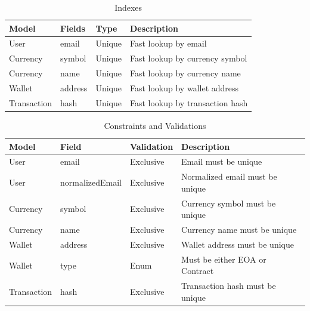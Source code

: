 \begin{table}[htbp]
  \centering
  \caption{Indexes}
  \footnotesize
  \renewcommand{\arraystretch}{1.4}
  \setlength{\tabcolsep}{6pt}
  \begin{tabular}{|l|l|l|p{4.8cm}|}
    \hline
    \textbf{Model} & \textbf{Fields} & \textbf{Type} & \textbf{Description} \\
    \hline
    User & email & Unique & Fast lookup by email \\
    \hline
    Currency & symbol & Unique & Fast lookup by currency symbol \\
    \hline
    Currency & name & Unique & Fast lookup by currency name \\
    \hline
    Wallet & address & Unique & Fast lookup by wallet address \\
    \hline
    Transaction & hash & Unique & Fast lookup by transaction hash \\
    \hline
  \end{tabular}
\end{table}

\begin{table}[htbp]
  \centering
  \caption{Constraints and Validations}
  \footnotesize
  \renewcommand{\arraystretch}{1.4}
  \setlength{\tabcolsep}{6pt}
  \begin{tabular}{|l|l|l|p{5cm}|}
    \hline
    \textbf{Model} & \textbf{Field} & \textbf{Validation} & \textbf{Description} \\
    \hline
    User & email & Exclusive & Email must be unique \\
    \hline
    User & normalizedEmail & Exclusive & Normalized email must be unique \\
    \hline
    Currency & symbol & Exclusive & Currency symbol must be unique \\
    \hline
    Currency & name & Exclusive & Currency name must be unique \\
    \hline
    Wallet & address & Exclusive & Wallet address must be unique \\
    \hline
    Wallet & type & Enum & Must be either EOA or Contract \\
    \hline
    Transaction & hash & Exclusive & Transaction hash must be unique \\
    \hline
  \end{tabular}
\end{table}
